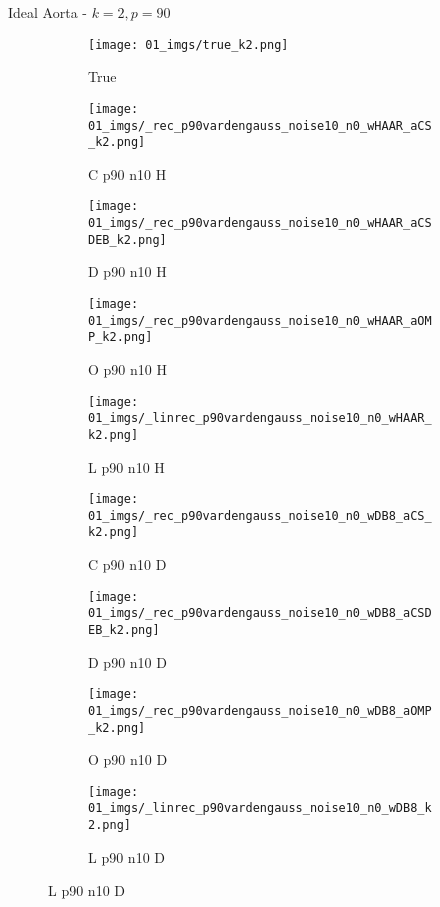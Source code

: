 \begin{frame}{Ideal Aorta - $k=2,p=90$}{}
\begin{figure}
\begin{subfigure}{0.1\textwidth}
\texttt{[image: 01\_imgs/true\_k2.png]}
\caption*{\Tiny True}
\end{subfigure}
\begin{subfigure}{0.1\textwidth}
\texttt{[image: 01\_imgs/\_rec\_p90vardengauss\_noise10\_n0\_wHAAR\_aCS\_k2.png]}
\caption*{\Tiny C p90 n10 H}
\end{subfigure}
\begin{subfigure}{0.1\textwidth}
\texttt{[image: 01\_imgs/\_rec\_p90vardengauss\_noise10\_n0\_wHAAR\_aCSDEB\_k2.png]}
\caption*{\Tiny D p90 n10 H}
\end{subfigure}
\begin{subfigure}{0.1\textwidth}
\texttt{[image: 01\_imgs/\_rec\_p90vardengauss\_noise10\_n0\_wHAAR\_aOMP\_k2.png]}
\caption*{\Tiny O p90 n10 H}
\end{subfigure}
\begin{subfigure}{0.1\textwidth}
\texttt{[image: 01\_imgs/\_linrec\_p90vardengauss\_noise10\_n0\_wHAAR\_k2.png]}
\caption*{\Tiny L p90 n10 H}
\end{subfigure}
\begin{subfigure}{0.1\textwidth}
\texttt{[image: 01\_imgs/\_rec\_p90vardengauss\_noise10\_n0\_wDB8\_aCS\_k2.png]}
\caption*{\Tiny C p90 n10 D}
\end{subfigure}
\begin{subfigure}{0.1\textwidth}
\texttt{[image: 01\_imgs/\_rec\_p90vardengauss\_noise10\_n0\_wDB8\_aCSDEB\_k2.png]}
\caption*{\Tiny D p90 n10 D}
\end{subfigure}
\begin{subfigure}{0.1\textwidth}
\texttt{[image: 01\_imgs/\_rec\_p90vardengauss\_noise10\_n0\_wDB8\_aOMP\_k2.png]}
\caption*{\Tiny O p90 n10 D}
\end{subfigure}
\begin{subfigure}{0.1\textwidth}
\texttt{[image: 01\_imgs/\_linrec\_p90vardengauss\_noise10\_n0\_wDB8\_k2.png]}
\caption*{\Tiny L p90 n10 D}
\end{subfigure}
\vspace{5pt}


\end{figure}
\end{frame}
